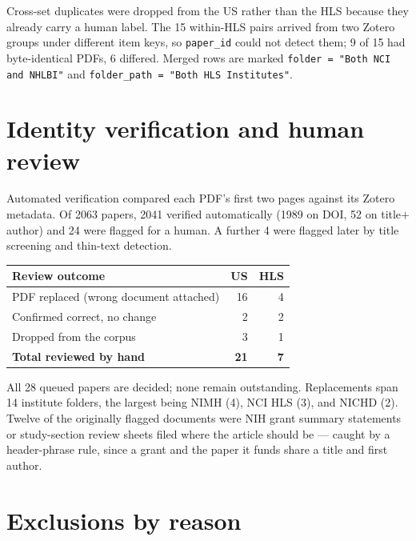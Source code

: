 \documentclass[11pt]{article}
\begin{document}
Cross-set duplicates were dropped from the US rather than the HLS because they already carry a human
label. The 15 within-HLS pairs arrived from two Zotero groups under different item keys, so
\texttt{paper\_id} could not detect them; 9 of 15 had byte-identical PDFs, 6 differed. Merged rows are
marked \texttt{folder = "Both NCI and NHLBI"} and \texttt{folder\_path = "Both HLS Institutes"}.

\section{Identity verification and human review}

Automated verification compared each PDF's first two pages against its Zotero metadata. Of 2063 papers,
2041 verified automatically (1989 on DOI, 52 on title$+$author) and 24 were flagged for a human. A further
4 were flagged later by title screening and thin-text detection.

\begin{table}[h]
\centering
\begin{tabular}{lrr}
\toprule
\textbf{Review outcome} & \textbf{US} & \textbf{HLS} \\
\midrule
PDF replaced (wrong document attached) & 16 & 4 \\
Confirmed correct, no change & 2 & 2 \\
Dropped from the corpus & 3 & 1 \\
\midrule
\textbf{Total reviewed by hand} & \textbf{21} & \textbf{7} \\
\bottomrule
\end{tabular}
\end{table}

All 28 queued papers are decided; none remain outstanding. Replacements span 14 institute folders, the
largest being NIMH (4), NCI HLS (3), and NICHD (2). Twelve of the originally flagged documents were
NIH grant summary statements or study-section review sheets filed where the article should be --- caught
by a header-phrase rule, since a grant and the paper it funds share a title and first author.

\section{Exclusions by reason}
\end{document}

